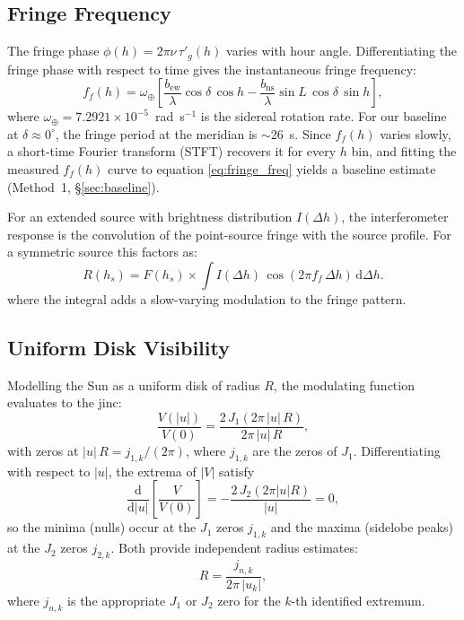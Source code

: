 \documentclass[10pt,preprint2]{aastex}
\begin{document}
\subsection{Fringe Frequency}
\label{sec:fringefreq}

The fringe phase $\phi(h) = 2\pi\nu\,\tau'_g(h)$ varies with hour angle. Differentiating the fringe phase with respect to time gives the instantaneous fringe frequency:
\begin{equation}
\label{eq:fringe_freq}
f_f(h) = \omega_\oplus\left[\frac{b_{\mathrm{ew}}}{\lambda}\cos\delta\,\cos h
  - \frac{b_{\mathrm{ns}}}{\lambda}\sin L\,\cos\delta\,\sin h\right],
\end{equation}
where $\omega_\oplus = 7.2921 \times 10^{-5}$~rad~s$^{-1}$ is the sidereal rotation rate. For our baseline at $\delta \approx 0^\circ$, the fringe period at the meridian is $\sim$26~s. Since $f_f(h)$ varies slowly, a short-time Fourier transform (STFT) recovers it for every $h$ bin, and fitting the measured $f_f(h)$ curve to equation \eqref{eq:fringe_freq} yields a baseline estimate (Method~1, \S\ref{sec:baseline}).

For an extended source with brightness distribution $I(\Delta h)$, the interferometer response is the convolution of the point-source fringe with the source profile. For a symmetric source this factors as:
\begin{equation}
\label{eq:fringe_modulator}
R(h_s) = F(h_s)
  \times
  \int I(\Delta h)\,\cos(2\pi f_f\,\Delta h)\,\mathrm{d}\Delta h.
\end{equation}
where the integral adds a slow-varying modulation to the fringe pattern.

\subsection{Uniform Disk Visibility}
\label{sec:jinc}

Modelling the Sun as a uniform disk of radius $R$, the modulating function evaluates to the jinc:
\begin{equation}
\label{eq:jinc}
\frac{V(|u|)}{V(0)} = \frac{2\,J_1(2\pi\,|u|\,R)}{2\pi\,|u|\,R},
\end{equation}
with zeros at $|u|\,R = j_{1,k}/(2\pi)$, where $j_{1,k}$ are the zeros of $J_1$. Differentiating with respect to $|u|$, the extrema of $|V|$ satisfy
\begin{equation}
\frac{\mathrm{d}}{\mathrm{d}|u|}\!\left[\frac{V}{V(0)}\right] = -\frac{2\,J_2(2\pi|u|R)}{|u|} = 0,
\end{equation}
so the minima (nulls) occur at the $J_1$ zeros $j_{1,k}$ and the maxima (sidelobe peaks) at the $J_2$ zeros $j_{2,k}$. Both provide independent radius estimates:
\begin{equation}
\label{eq:diameter_from_null}
R = \frac{j_{n,k}}{2\pi\,|u_k|},
\end{equation}
where $j_{n,k}$ is the appropriate $J_1$ or $J_2$ zero for the $k$-th identified extremum.
\end{document}
